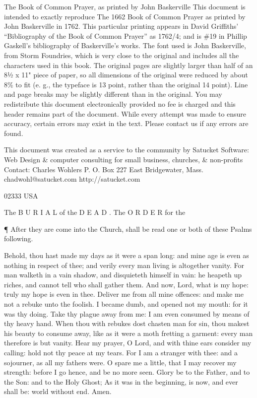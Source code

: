 
The Book of Common Prayer, as printed by John Baskerville This document is intended to exactly reproduce The 1662 Book of Common Prayer as printed by John Baskerville in 1762. This particular printing appears in David Griffiths' “Bibliography of the Book of Common Prayer” as 1762/4; and is \#19 in Phillip Gaskell's bibliography of Baskerville's works. The font used is John Baskerville, from Storm Foundries, which is very close to the original and includes all the characters used in this book. The original pages are slightly larger than half of an 8½ x 11" piece of paper, so all dimensions of the original were reduced by about 8\% to fit (e. g., the typeface is 13 point, rather than the original 14 point). Line and page breaks may be slightly different than in the original. You may redistribute this document electronically provided no fee is charged and this header remains part of the document. While every attempt was made to ensure accuracy, certain errors may exist in the text. Please contact us if any errors are found.

This document was created as a service to the community by Satucket Software: Web Design \& computer consulting for small business, churches, \& non-profits Contact: Charles Wohlers P. O. Box 227 East Bridgewater, Mass. chadwohl@satucket.com http://satucket.com

02333 USA

The B U R I A L of the D E A D . The O R D E R for the

¶ After they are come into the Church, shall be read one or both of these Psalms following.

Behold, thou hast made my days as it were a span long: and mine age is even as nothing in respect of thee; and verily every man living is altogether vanity. For man walketh in a vain shadow, and disquieteth himself in vain: he heapeth up riches, and cannot tell who shall gather them. And now, Lord, what is my hope: truly my hope is even in thee. Deliver me from all mine offences: and make me not a rebuke unto the foolish. I became dumb, and opened not my mouth: for it was thy doing. Take thy plague away from me: I am even consumed by means of thy heavy hand. When thou with rebukes dost chasten man for sin, thou makest his beauty to consume away, like as it were a moth fretting a garment: every man therefore is but vanity. Hear my prayer, O Lord, and with thine ears consider my calling: hold not thy peace at my tears. For I am a stranger with thee: and a sojourner, as all my fathers were. O spare me a little, that I may recover my strength: before I go hence, and be no more seen. Glory be to the Father, and to the Son: and to the Holy Ghost; As it was in the beginning, is now, and ever shall be: world without end. Amen.

